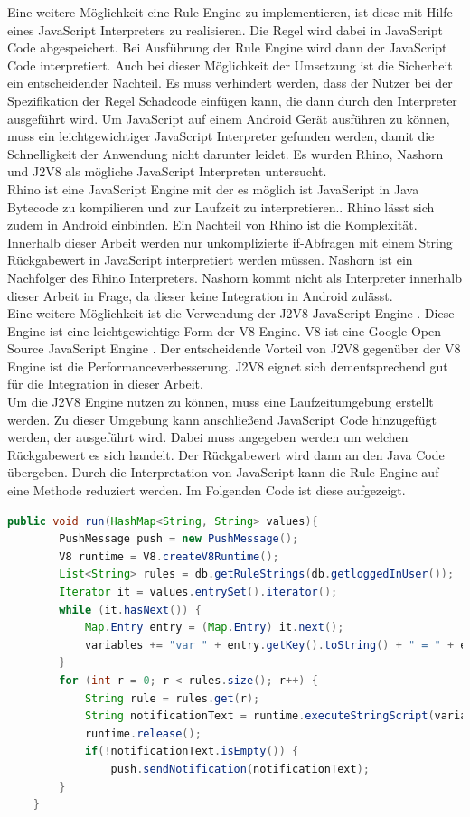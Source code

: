 Eine weitere Möglichkeit eine Rule Engine zu implementieren, ist diese mit Hilfe eines JavaScript Interpreters zu realisieren. Die Regel wird dabei in JavaScript Code abgespeichert. Bei Ausführung der Rule Engine wird dann der JavaScript Code interpretiert. Auch bei dieser Möglichkeit der Umsetzung ist die Sicherheit ein entscheidender Nachteil. Es muss verhindert werden, dass der Nutzer bei der Spezifikation der Regel Schadcode einfügen kann, die dann durch den Interpreter ausgeführt wird. Um JavaScript auf einem Android Gerät ausführen zu können, muss ein leichtgewichtiger JavaScript Interpreter gefunden werden, damit die Schnelligkeit der Anwendung nicht darunter leidet. Es wurden Rhino, Nashorn und J2V8 als mögliche  JavaScript Interpreten untersucht.\\
Rhino ist eine JavaScript Engine mit der es möglich ist JavaScript in Java Bytecode zu kompilieren und zur Laufzeit zu interpretieren.\cite{mozilla:rhino}. Rhino lässt sich zudem in Android einbinden. Ein Nachteil von Rhino ist die Komplexität. Innerhalb dieser Arbeit werden nur unkomplizierte if-Abfragen mit einem String Rückgabewert in JavaScript interpretiert werden müssen. Nashorn ist ein Nachfolger des Rhino Interpreters. Nashorn kommt nicht als Interpreter innerhalb dieser Arbeit in Frage, da dieser keine Integration in Android zulässt.\\
Eine weitere Möglichkeit ist die Verwendung der J2V8 JavaScript Engine \cite{github:j2v8}. Diese Engine ist eine leichtgewichtige Form der V8 Engine. V8 ist eine Google Open Source JavaScript Engine \cite{github:v8}. Der entscheidende Vorteil von J2V8 gegenüber der V8 Engine ist die Performanceverbesserung. J2V8 eignet sich dementsprechend gut für die Integration in dieser Arbeit.\\
Um die J2V8 Engine nutzen zu können, muss eine Laufzeitumgebung erstellt werden. Zu dieser Umgebung kann anschließend JavaScript Code hinzugefügt werden, der ausgeführt wird. Dabei muss angegeben werden um welchen Rückgabewert es sich handelt. Der Rückgabewert wird dann an den Java Code übergeben. Durch die Interpretation von JavaScript kann die Rule Engine auf eine Methode reduziert werden. Im Folgenden Code ist diese aufgezeigt.
\begin{lstlisting}[language=java, caption={Rule Engine Implementierung}]
	public void run(HashMap<String, String> values){
		PushMessage push = new PushMessage();
    	V8 runtime = V8.createV8Runtime();
        List<String> rules = db.getRuleStrings(db.getloggedInUser());
        Iterator it = values.entrySet().iterator();
        while (it.hasNext()) {
            Map.Entry entry = (Map.Entry) it.next();
            variables += "var " + entry.getKey().toString() + " = " + entry.getValue() + ";";
        }
        for (int r = 0; r < rules.size(); r++) {
            String rule = rules.get(r);
            String notificationText = runtime.executeStringScript(variables + rule);
            runtime.release();
            if(!notificationText.isEmpty()) {
                push.sendNotification(notificationText);
        }
    }
\end{lstlisting}
